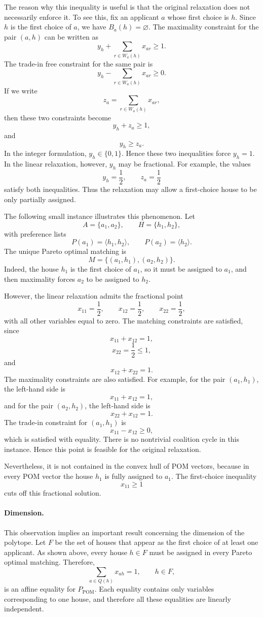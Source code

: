 \documentclass[12pt]{report}
\numberwithin{algorithm}{chapter}
\begin{document}
	The reason why this inequality is useful is that the original relaxation does not necessarily enforce it. To see this, fix an applicant $a$ whose first choice is $h$. Since $h$ is the first choice of $a$, we have $B_a(h)=\varnothing$. The maximality constraint for the pair $(a,h)$ can be written as
	\[
	y_h+\sum_{r\in W_a(h)}x_{ar}\ge 1.
	\]
	The trade-in free constraint for the same pair is
	\[
	y_h-\sum_{r\in W_a(h)}x_{ar}\ge 0.
	\]
	If we write
	\[
	z_a=\sum_{r\in W_a(h)}x_{ar},
	\]
	then these two constraints become
	\[
	y_h+z_a\ge 1,
	\]
	and
	\[
	y_h\ge z_a.
	\]
	In the integer formulation, $y_h\in\{0,1\}$. Hence these two inequalities force $y_h=1$. In the linear relaxation, however, $y_h$ may be fractional. For example, the values
	\[
	y_h=\frac{1}{2},
	\qquad
	z_a=\frac{1}{2}
	\]
	satisfy both inequalities. Thus the relaxation may allow a first-choice house to be only partially assigned.
	
	The following small instance illustrates this phenomenon. Let
	\[
	A=\{a_1,a_2\},
	\qquad
	H=\{h_1,h_2\},
	\]
	with preference lists
	\[
	P(a_1)=\langle h_1,h_2\rangle,
	\qquad
	P(a_2)=\langle h_2\rangle.
	\]
	The unique Pareto optimal matching is
	\[
	M=\{(a_1,h_1),(a_2,h_2)\}.
	\]
	Indeed, the house $h_1$ is the first choice of $a_1$, so it must be assigned to $a_1$, and then maximality forces $a_2$ to be assigned to $h_2$.
	
	However, the linear relaxation admits the fractional point
	\[
	x_{11}=\frac{1}{2},
	\qquad
	x_{12}=\frac{1}{2},
	\qquad
	x_{22}=\frac{1}{2},
	\]
	with all other variables equal to zero. The matching constraints are satisfied, since
	\[
	x_{11}+x_{12}=1,
	\]
	\[
	x_{22}=\frac{1}{2}\le 1,
	\]
	and
	\[
	x_{12}+x_{22}=1.
	\]
	The maximality constraints are also satisfied. For example, for the pair $(a_1,h_1)$, the left-hand side is
	\[
	x_{11}+x_{12}=1,
	\]
	and for the pair $(a_2,h_2)$, the left-hand side is
	\[
	x_{22}+x_{12}=1.
	\]
	The trade-in constraint for $(a_1,h_1)$ is
	\[
	x_{11}-x_{12}\ge 0,
	\]
	which is satisfied with equality. There is no nontrivial coalition cycle in this instance. Hence this point is feasible for the original relaxation.
	
	Nevertheless, it is not contained in the convex hull of POM vectors, because in every POM vector the house $h_1$ is fully assigned to $a_1$. The first-choice inequality
	\[
	x_{11}\ge 1
	\]
	cuts off this fractional solution.

	\paragraph{Dimension.}
	This observation implies an important result concerning the dimension of the polytope. Let $F$ be the set of houses
	that appear as the first choice of at least one applicant. As shown above, every house $h\in F$ must be assigned in every Pareto optimal matching. Therefore,
	\[
	\sum_{a\in Q(h)}x_{ah}=1,\qquad h\in F,
	\]
	is an affine equality for $P_{\mathrm{POM}}$. Each equality contains only variables corresponding to one house, and therefore all these equalities are linearly independent.
	
\end{document}
